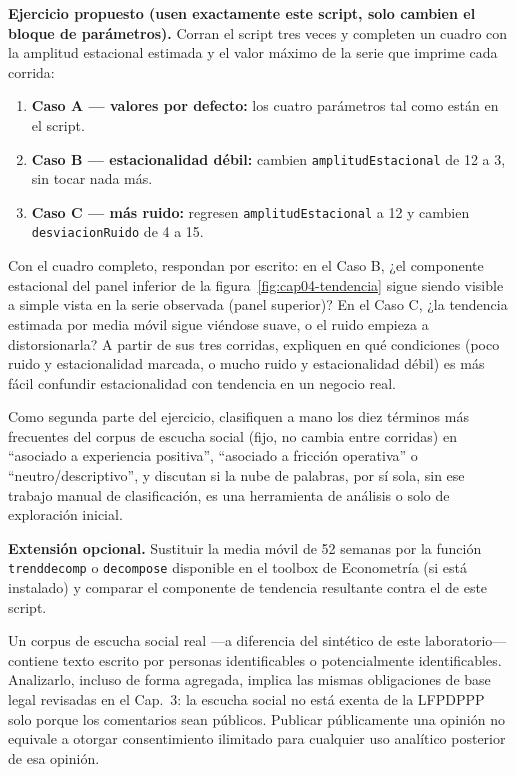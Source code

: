 \begin{cajaLaboratorio}
\textbf{Ejercicio propuesto (usen exactamente este script, solo cambien el
bloque de parámetros).} Corran el script tres veces y completen un cuadro
con la amplitud estacional estimada y el valor máximo de la serie que
imprime cada corrida:
\begin{enumerate}
  \item \textbf{Caso A — valores por defecto:} los cuatro parámetros tal
  como están en el script.
  \item \textbf{Caso B — estacionalidad débil:} cambien
  \texttt{amplitudEstacional} de 12 a 3, sin tocar nada más.
  \item \textbf{Caso C — más ruido:} regresen \texttt{amplitudEstacional} a
  12 y cambien \texttt{desviacionRuido} de 4 a 15.
\end{enumerate}
Con el cuadro completo, respondan por escrito: en el Caso B, ¿el componente
estacional del panel inferior de la figura~\ref{fig:cap04-tendencia} sigue
siendo visible a simple vista en la serie observada (panel superior)? En el
Caso C, ¿la tendencia estimada por media móvil sigue viéndose suave, o el
ruido empieza a distorsionarla? A partir de sus tres corridas, expliquen en
qué condiciones (poco ruido y estacionalidad marcada, o mucho ruido y
estacionalidad débil) es más fácil confundir estacionalidad con tendencia en
un negocio real.

Como segunda parte del ejercicio, clasifiquen a mano los diez términos más
frecuentes del corpus de escucha social (fijo, no cambia entre corridas) en
\enquote{asociado a experiencia positiva}, \enquote{asociado a fricción
operativa} o \enquote{neutro/descriptivo}, y discutan si la nube de palabras,
por sí sola, sin ese trabajo manual de clasificación, es una herramienta de
análisis o solo de exploración inicial.

\textbf{Extensión opcional.} Sustituir la media móvil de 52 semanas por la
función \texttt{trenddecomp} o \texttt{decompose} disponible en el toolbox
de Econometría (si está instalado) y comparar el componente de tendencia
resultante contra el de este script.
\end{cajaLaboratorio}

\begin{cajaEtica}
Un corpus de escucha social real —a diferencia del sintético de este
laboratorio— contiene texto escrito por personas identificables o
potencialmente identificables. Analizarlo, incluso de forma agregada,
implica las mismas obligaciones de base legal revisadas en el Cap.~3: la
escucha social no está exenta de la LFPDPPP solo porque los comentarios sean
públicos. Publicar públicamente una opinión no equivale a otorgar
consentimiento ilimitado para cualquier uso analítico posterior de esa
opinión.
\end{cajaEtica}

